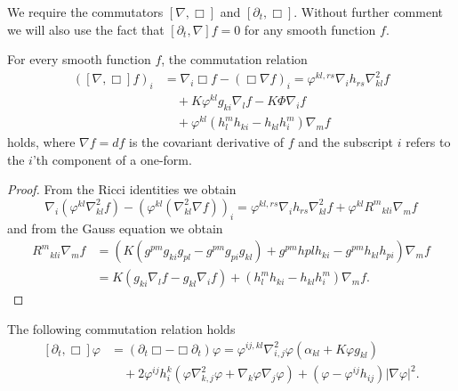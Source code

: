 \documentclass{amsart}
\begin{document}
We require the commutators \([\nabla, \Box]\) and \([\partial_t, \Box]\). Without further comment we will also use the fact that \([\partial_t, \nabla] f = 0\) for any smooth function \(f\).

\begin{lemma}
\label{lem:gradBox}
For every smooth function $f$, the commutation relation
\[
\begin{split}
([\nabla, \Box]f)_i &= \nabla_i \Box f - (\Box \nabla f)_i = \varphi^{kl,rs} \nabla_i h_{rs} \nabla^2_{kl} f \\
&\quad + K \varphi^{kl} g_{ki} \nabla_l f - K \Phi \nabla_i f \\
&\quad + \varphi^{kl}\left(h^{m}_{l}h_{ki} - h_{kl}h^{m}_{i}\right) \nabla_m f
\end{split}
\]
holds, where \(\nabla f = df\) is the covariant derivative of \(f\) and the subscript \(i\) refers to the \(i\)'th component of a one-form.
\end{lemma}

\begin{proof}
From the Ricci identities we obtain
\[
\nabla_i (\varphi^{kl} \nabla^2_{kl} f) - (\varphi^{kl}(\nabla^2_{kl} \nabla f))_i = \varphi^{kl,rs} \nabla_i h_{rs} \nabla^2_{kl}f + \varphi^{kl}{R^{m}}_{kli} \nabla_m f
\]
and from the Gauss equation we obtain
\[
\begin{split}
{R^{m}}_{kli} \nabla_m f &= \left(K\left(g^{pm}g_{ki}g_{pl}  - g^{pm}g_{pi}g_{kl}\right) + g^{pm} h{pl}h_{ki} - g^{pm}h_{kl}h_{pi}\right) \nabla_m f \\
&= K\left(g_{ki} \nabla_l f - g_{kl} \nabla_i f\right) + \left(h^{m}_{l}h_{ki} - h_{kl}h^{m}_{i}\right) \nabla_m f.
\end{split}
\]
\end{proof}

\begin{lemma}
\label{lem:deltBox}
The following commutation relation holds
\[
\begin{split}
[\partial_t, \Box] \varphi &= (\partial_{t}\Box - \Box\partial_{t}) \varphi = \varphi^{ij,kl} \nabla^2_{i,j} \varphi (\alpha_{kl} + K \varphi g_{kl}) \\
&\quad + 2\varphi^{ij}h^{k}_{i} (\varphi \nabla^2_{k,j} \varphi + \nabla_k \varphi \nabla_j \varphi) + (\varphi - \varphi^{ij}h_{ij})| \nabla\varphi|^{2}.
\end{split}
\]
\end{lemma}
\end{document}
